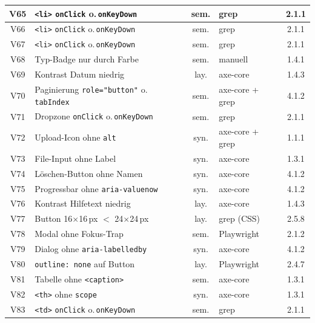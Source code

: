 \begin{longtable}{|c|p{5.8cm}|c|p{3.6cm}|c|}
V65  & \texttt{<li>} \texttt{onClick} o.\,\texttt{onKeyDown} & sem. & grep    & 2.1.1 \\ \hline
V66  & \texttt{<li>} \texttt{onClick} o.\,\texttt{onKeyDown} & sem. & grep    & 2.1.1 \\ \hline
V67  & \texttt{<li>} \texttt{onClick} o.\,\texttt{onKeyDown} & sem. & grep    & 2.1.1 \\ \hline
V68  & Typ-Badge nur durch Farbe                 & sem. & manuell                 & 1.4.1 \\ \hline
V69  & Kontrast Datum niedrig                    & lay. & axe-core                & 1.4.3 \\ \hline
V70  & Paginierung \texttt{role="button"} o.\,\texttt{tabIndex} & sem. & axe-core + grep & 4.1.2 \\ \hline
V71  & Dropzone \texttt{onClick} o.\,\texttt{onKeyDown} & sem. & grep          & 2.1.1 \\ \hline
V72  & Upload-Icon ohne \texttt{alt}             & syn. & axe-core + grep         & 1.1.1 \\ \hline
V73  & File-Input ohne Label                     & syn. & axe-core                & 1.3.1 \\ \hline
V74  & Löschen-Button ohne Namen                & syn. & axe-core                & 4.1.2 \\ \hline
V75  & Progressbar ohne \texttt{aria-valuenow}   & syn. & axe-core                & 4.1.2 \\ \hline
V76  & Kontrast Hilfetext niedrig                & lay. & axe-core                & 1.4.3 \\ \hline
V77  & Button 16$\times$16\,px $<$ 24$\times$24\,px & lay. & grep (CSS)     & 2.5.8 \\ \hline
V78  & Modal ohne Fokus-Trap                     & sem. & Playwright              & 2.1.2 \\ \hline
V79  & Dialog ohne \texttt{aria-labelledby}      & syn. & axe-core                & 4.1.2 \\ \hline
V80  & \texttt{outline: none} auf Button         & lay. & Playwright              & 2.4.7 \\ \hline
V81  & Tabelle ohne \texttt{<caption>}           & sem. & axe-core                & 1.3.1 \\ \hline
V82  & \texttt{<th>} ohne \texttt{scope}         & syn. & axe-core                & 1.3.1 \\ \hline
V83  & \texttt{<td>} \texttt{onClick} o.\,\texttt{onKeyDown} & sem. & grep    & 2.1.1 \\ \hline

\end{longtable}
